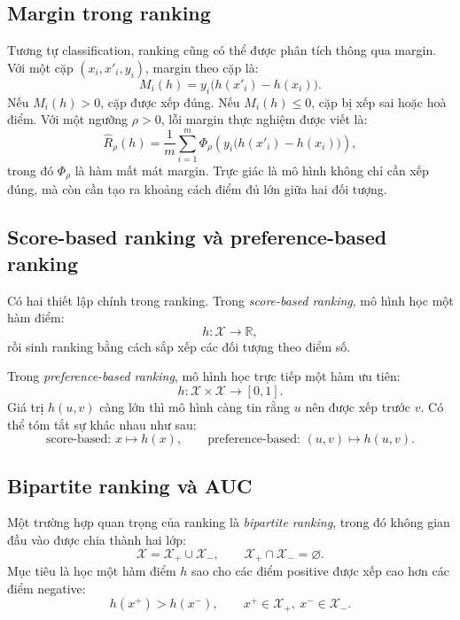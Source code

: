 \subsection{Margin trong ranking}

Tương tự classification, ranking cũng có thể được phân tích thông qua margin. Với một cặp \((x_i,x'_i,y_i)\), margin theo cặp là:
\begin{equation}
    M_i(h)
    =
    y_i\big(h(x'_i)-h(x_i)\big).
    \label{eq:pairwise-margin}
\end{equation}
Nếu \(M_i(h)>0\), cặp được xếp đúng. Nếu \(M_i(h)\leq 0\), cặp bị xếp sai hoặc hoà điểm. Với một ngưỡng \(\rho>0\), lỗi margin thực nghiệm được viết là:
\begin{equation}
    \widehat{R}_{\rho}(h)
    =
    \frac{1}{m}
    \sum_{i=1}^{m}
    \Phi_{\rho}
    \left(
        y_i\big(h(x'_i)-h(x_i)\big)
    \right),
    \label{eq:empirical-margin-loss}
\end{equation}
trong đó \(\Phi_{\rho}\) là hàm mất mát margin. Trực giác là mô hình không chỉ cần xếp đúng, mà còn cần tạo ra khoảng cách điểm đủ lớn giữa hai đối tượng.

\subsection{Score-based ranking và preference-based ranking}

Có hai thiết lập chính trong ranking. Trong \textit{score-based ranking}, mô hình học một hàm điểm:
\[
    h:\mathcal{X}\rightarrow\mathbb{R},
\]
rồi sinh ranking bằng cách sắp xếp các đối tượng theo điểm số.

Trong \textit{preference-based ranking}, mô hình học trực tiếp một hàm ưu tiên:
\[
    h:\mathcal{X}\times\mathcal{X}\rightarrow[0,1].
\]
Giá trị \(h(u,v)\) càng lớn thì mô hình càng tin rằng \(u\) nên được xếp trước \(v\). Có thể tóm tắt sự khác nhau như sau:
\[
    \text{score-based: } x\mapsto h(x),
    \qquad
    \text{preference-based: } (u,v)\mapsto h(u,v).
\]

\subsection{Bipartite ranking và AUC}

Một trường hợp quan trọng của ranking là \textit{bipartite ranking}, trong đó không gian đầu vào được chia thành hai lớp:
\[
    \mathcal{X}=\mathcal{X}_{+}\cup\mathcal{X}_{-},
    \qquad
    \mathcal{X}_{+}\cap\mathcal{X}_{-}=\varnothing.
\]
Mục tiêu là học một hàm điểm \(h\) sao cho các điểm positive được xếp cao hơn các điểm negative:
\[
    h(x^{+})>h(x^{-}),
    \qquad
    x^{+}\in\mathcal{X}_{+},\ x^{-}\in\mathcal{X}_{-}.
\]


